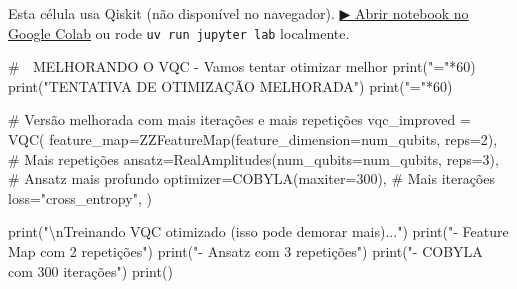 \documentclass[
  brazilian,
]{report}
\newenvironment{Shaded}{\begin{snugshade}}{\end{snugshade}}
\newcommand{\BuiltInTok}[1]{\textcolor[rgb]{0.00,0.23,0.31}{#1}}
\newcommand{\CharTok}[1]{\textcolor[rgb]{0.13,0.47,0.30}{#1}}
\newcommand{\CommentTok}[1]{\textcolor[rgb]{0.37,0.37,0.37}{#1}}
\newcommand{\DecValTok}[1]{\textcolor[rgb]{0.68,0.00,0.00}{#1}}
\newcommand{\NormalTok}[1]{\textcolor[rgb]{0.00,0.23,0.31}{#1}}
\newcommand{\OperatorTok}[1]{\textcolor[rgb]{0.37,0.37,0.37}{#1}}
\newcommand{\StringTok}[1]{\textcolor[rgb]{0.13,0.47,0.30}{#1}}
\begin{document}
\begin{tcolorbox}[enhanced jigsaw, arc=.35mm, bottomrule=.15mm, bottomtitle=1mm, breakable, colback=white, colbacktitle=quarto-callout-warning-color!10!white, colframe=quarto-callout-warning-color-frame, coltitle=black, left=2mm, leftrule=.75mm, opacityback=0, opacitybacktitle=0.6, rightrule=.15mm, title=\textcolor{quarto-callout-warning-color}{\faExclamationTriangle}\hspace{0.5em}{⚛️ Célula Qiskit --- execute no Colab ou localmente}, titlerule=0mm, toprule=.15mm, toptitle=1mm]

Esta célula usa Qiskit (não disponível no navegador).
\href{https://colab.research.google.com/github/maxwellamaral/aula-quantum/blob/main/notebooks/20-quantum-machine-learning.ipynb}{▶
Abrir notebook no Google Colab} ou rode \texttt{uv\ run\ jupyter\ lab}
localmente.

\begin{Shaded}
\begin{Highlighting}[]

\CommentTok{\# 🔧 MELHORANDO O VQC {-} Vamos tentar otimizar melhor}
\BuiltInTok{print}\NormalTok{(}\StringTok{"="}\OperatorTok{*}\DecValTok{60}\NormalTok{)}
\BuiltInTok{print}\NormalTok{(}\StringTok{"TENTATIVA DE OTIMIZAÇÃO MELHORADA"}\NormalTok{)}
\BuiltInTok{print}\NormalTok{(}\StringTok{"="}\OperatorTok{*}\DecValTok{60}\NormalTok{)}

\CommentTok{\# Versão melhorada com mais iterações e mais repetições}
\NormalTok{vqc\_improved }\OperatorTok{=}\NormalTok{ VQC(}
\NormalTok{    feature\_map}\OperatorTok{=}\NormalTok{ZZFeatureMap(feature\_dimension}\OperatorTok{=}\NormalTok{num\_qubits, reps}\OperatorTok{=}\DecValTok{2}\NormalTok{),  }\CommentTok{\# Mais repetições}
\NormalTok{    ansatz}\OperatorTok{=}\NormalTok{RealAmplitudes(num\_qubits}\OperatorTok{=}\NormalTok{num\_qubits, reps}\OperatorTok{=}\DecValTok{3}\NormalTok{),  }\CommentTok{\# Ansatz mais profundo}
\NormalTok{    optimizer}\OperatorTok{=}\NormalTok{COBYLA(maxiter}\OperatorTok{=}\DecValTok{300}\NormalTok{),  }\CommentTok{\# Mais iterações}
\NormalTok{    loss}\OperatorTok{=}\StringTok{"cross\_entropy"}\NormalTok{,}
\NormalTok{)}

\BuiltInTok{print}\NormalTok{(}\StringTok{"}\CharTok{\textbackslash{}n}\StringTok{Treinando VQC otimizado (isso pode demorar mais)..."}\NormalTok{)}
\BuiltInTok{print}\NormalTok{(}\StringTok{"{-} Feature Map com 2 repetições"}\NormalTok{)}
\BuiltInTok{print}\NormalTok{(}\StringTok{"{-} Ansatz com 3 repetições"}\NormalTok{)  }
\BuiltInTok{print}\NormalTok{(}\StringTok{"{-} COBYLA com 300 iterações"}\NormalTok{)}
\BuiltInTok{print}\NormalTok{()}


\end{Highlighting}
\end{Shaded}
\end{tcolorbox}
\end{document}
